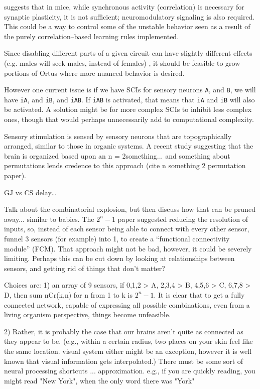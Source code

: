 \documentclass[letterpaper]{article}
\begin{document}
\cite{Johansens2014} suggests that in mice, while synchronous activity (correlation) is necessary for synaptic plasticity, it is not sufficient; neuromodulatory signaling is also required. This could be a way to control some of the unstable behavior seen as a result of the purely correlation--based learning rules implemented.


Since disabling different parts of a given circuit can have slightly different effects (e.g. males will seek males, instead of females) \citet{Weiner2015}, it should be feasible to grow portions of Ortus where more nuanced behavior is desired.

However one current issue is if we have SCIs for sensory neurons \texttt{A}, and \texttt{B}, we will have \texttt{iA}, and \texttt{iB}, and \texttt{iAB}. If \texttt{iAB} is activated, that means that \texttt{iA} and \texttt{iB} will also be activated. A solution might be for more complex SCIs to inhibit less complex ones, though that would perhaps unnecessarily add to computational complexity.

Sensory stimulation is sensed by sensory neurons that are topographically arranged, similar to those in organic systems. A recent study suggesting that the brain is organized based upon an n = 2something... and something about permutations lends credence to this approach (cite n something 2 permutation paper).

GJ vs CS delay\ldots

Talk about the combinatorial explosion, but then discuss how that can be pruned away... similar to babies. The $2^n - 1$ paper suggested reducing the resolution of inputs, so, instead of each sensor being able to connect with every other sensor, funnel 3 sensors (for example) into 1, to create a ``functional connectivity module'' (FCM). That approach might not be bad, however, it could be severely limiting. Perhaps this can be cut down by looking at relationships between sensors, and getting rid of things that don't matter?

Choices are:
1) an array of 9 sensors, if 0,1,2 > A, 2,3,4 > B, 4,5,6 > C, 6,7,8 > D, then sum {nCr(k,n)} for n from 1 to k is $2^n - 1$. It is clear that to get a fully connected network, capable of expressing all possible combinations, even from a living organism perspective, things become unfeasible.

2) Rather, it is probably the case that our brains aren't quite as connected as they appear to be. (e.g., within a certain radius, two places on your skin feel like the same location. visual system either might be an exception, however it is well known that visual information gets interpolated.)
There must be some sort of neural processing shortcuts ... approximation. e.g., if you are quickly reading, you might read "New York", when the only word there was "York"
\end{document}
